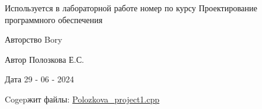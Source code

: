 Используется в лабораторной работе номер по курсу Проектирование программного обеспечения \begin{DoxyCopyright}{Авторство}
Bory 
\end{DoxyCopyright}
\begin{DoxyAuthor}{Автор}
Полозкова Е.\+С. 
\end{DoxyAuthor}
\begin{DoxyDate}{Дата}
29 -\/ 06 -\/ 2024 
\end{DoxyDate}
\begin{DoxyParagraph}{Cogepжит файлы\+:}
\hyperlink{_polozkova__project1_8cpp}{Polozkova\+\_\+project1.\+cpp} 
\end{DoxyParagraph}
